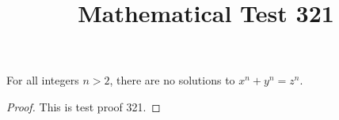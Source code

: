 \documentclass{amsart}
\begin{document}
\title{Mathematical Test 321}
\begin{theorem}
For all integers $n > 2$, there are no solutions to $x^n + y^n = z^n$.
\end{theorem}
\begin{proof}
This is test proof 321.
\end{proof}
\end{document}
